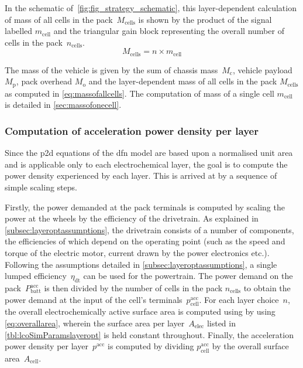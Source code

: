 In  the  schematic  of~\cref{fig:fig_strategy_schematic},  this  layer-dependent
calculation of  mass of all cells  in the pack~$M_\text{cells}$ is  shown by the
product of  the signal  labelled $m_\text{cell}$ and  the triangular  gain block
representing the overall number of cells in the pack~$n_\text{cells}$.
\begin{equation}\label{eq:massofallcells}
    M_\text{cells} = n \times m_\text{cell}
\end{equation}

The  mass of  the vehicle  is  given by  the sum  of chassis  mass~$M_\text{c}$,
vehicle payload $M_\text{p}$, pack overhead $M_\text{o}$ and the layer-dependent
mass   of   all   cells   in   the  pack   $M_\text{cells}$   as   computed   in
\cref{eq:massofallcells}.   The   computation  of   mass   of   a  single   cell
$m_\text{cell}$ is detailed in \cref{sec:massofonecell}.

\subsubsection*{Computation of acceleration power density per layer}

Since the \gls{p2d} equations of the \gls{dfn} model are based upon a normalised
unit area and is  applicable only to each electrochemical layer,  the goal is to
compute the  power density experienced  by each layer. This  is arrived at  by a
sequence of simple scaling steps.

Firstly, the  power demanded at  the pack terminals  is computed by  scaling the
power  at the  wheels  by the  efficiency  of the  drivetrain.  As explained  in
\cref{subsec:layeroptassumptions},  the  drivetrain  consists  of  a  number  of
components, the efficiencies of which depend on the operating point (such as the
speed and torque  of the electric motor, current drawn  by the power electronics
etc.). Following the  assumptions detailed in \cref{subsec:layeroptassumptions},
a  single lumped  efficiency~$\eta_\text{dt}$ can  be used  for the  powertrain.
The  power demand  on  the pack~$P^\text{acc}_\text{batt}$  is  then divided  by
the  number  of  cells  in  the   pack  $n_\text{cells}$  to  obtain  the  power
demand  at the  input  of the  cell's terminals~$p^\text{acc}_\text{cell}$.  For
each  layer choice~$n$,  the overall  electrochemically active  surface area  is
computed  using by  using \cref{eq:overallarea},  wherein the  surface area  per
layer~$A_\text{elec}$ listed in \cref{tbl:lcoSimParamslayeropt} is held constant
throughout.  Finally, the  acceleration power  density per  layer~$p^\text{acc}$
is  computed  by  dividing  $p^\text{acc}_\text{cell}$ by  the  overall  surface
area~$A_\text{cell}$.

